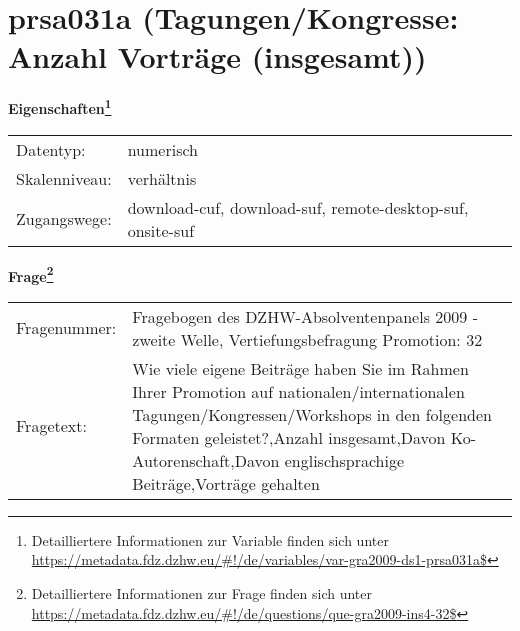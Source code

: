 
    \setcounter{footnote}{0}

    \vspace*{-1.8cm}
	\section{prsa031a (Tagungen/Kongresse: Anzahl Vorträge (insgesamt))}
	\label{section:prsa031a}



    \vspace*{0.5cm}
    \noindent\textbf{Eigenschaften\footnote{Detailliertere Informationen zur Variable finden sich unter
		\url{https://metadata.fdz.dzhw.eu/\#!/de/variables/var-gra2009-ds1-prsa031a$}}}\\
	\begin{tabularx}{\hsize}{@{}lX}
	Datentyp: & numerisch \\
	Skalenniveau: & verhältnis \\
	Zugangswege: &
	  download-cuf, 
	  download-suf, 
	  remote-desktop-suf, 
	  onsite-suf
 \\
    \end{tabularx}



				\vspace*{0.5cm}
                \noindent\textbf{Frage\footnote{Detailliertere Informationen zur Frage finden sich unter
		              \url{https://metadata.fdz.dzhw.eu/\#!/de/questions/que-gra2009-ins4-32$}}}\\
				\begin{tabularx}{\hsize}{@{}lX}
					Fragenummer: &
					  Fragebogen des DZHW-Absolventenpanels 2009 - zweite Welle, Vertiefungsbefragung Promotion:
					  32
 \\
					Fragetext: & Wie viele eigene Beiträge haben Sie im Rahmen Ihrer Promotion auf nationalen/internationalen Tagungen/Kongressen/Workshops in den folgenden Formaten geleistet?,Anzahl insgesamt,Davon Ko-Autorenschaft,Davon englischsprachige Beiträge,Vorträge gehalten \\
				\end{tabularx}





